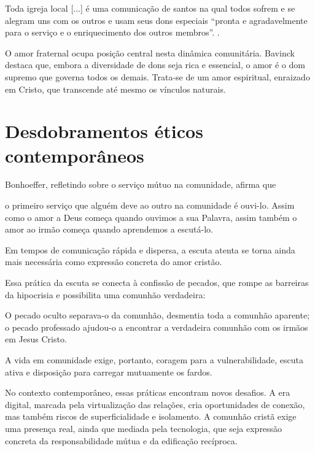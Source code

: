 \begin{citacao}
Toda igreja local [...] é uma comunicação de santos na qual todos sofrem e se alegram uns com os outros e usam seus dons especiais ``pronta e agradavelmente para o serviço e o enriquecimento dos outros membros''. \cite[p.~380]{bavinck2012}.
\end{citacao}

O amor fraternal ocupa posição central nesta dinâmica comunitária. Bavinck destaca que, embora a diversidade de dons seja rica e essencial, o amor é o dom supremo que governa todos os demais\cite[p.~304]{bavinck2012}. Trata-se de um amor espiritual, enraizado em Cristo, que transcende até mesmo os vínculos naturais.\cite[p.~304]{bavinck2012}

\section{Desdobramentos éticos contemporâneos}

Bonhoeffer, refletindo sobre o serviço mútuo na comunidade, afirma que
\begin{citacao}
o primeiro serviço que alguém deve ao outro na comunidade é ouvi-lo. Assim como o amor a Deus começa quando ouvimos a sua Palavra, assim também o amor ao irmão começa quando aprendemos a escutá-lo. \cite[pp.~75--76]{bonhoeffer1997}
\end{citacao}
Em tempos de comunicação rápida e dispersa, a escuta atenta se torna ainda mais necessária como expressão concreta do amor cristão.

Essa prática da escuta se conecta à confissão de pecados, que rompe as barreiras da hipocrisia e possibilita uma comunhão verdadeira:
\begin{citacao}
O pecado oculto separava-o da comunhão, desmentia toda a comunhão aparente; o pecado professado ajudou-o a encontrar a verdadeira comunhão com os irmãos em Jesus Cristo. \cite[p.~88]{bonhoeffer1997}
\end{citacao}

A vida em comunidade exige, portanto, coragem para a vulnerabilidade, escuta ativa e disposição para carregar mutuamente os fardos.

No contexto contemporâneo, essas práticas encontram novos desafios. A era digital, marcada pela virtualização das relações, cria oportunidades de conexão, mas também riscos de superficialidade e isolamento. A comunhão cristã exige uma presença real, ainda que mediada pela tecnologia, que seja expressão concreta da responsabilidade mútua e da edificação recíproca.

